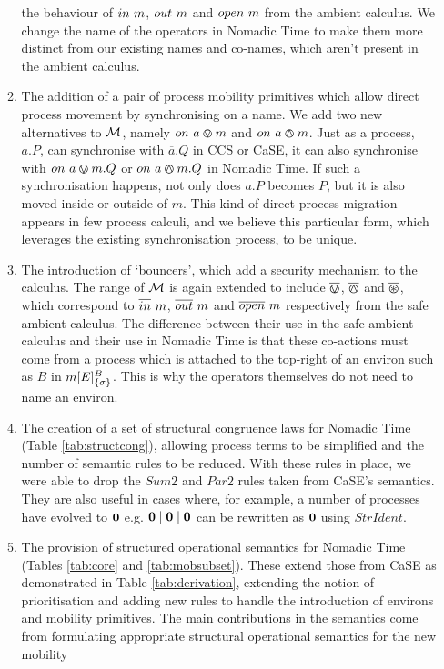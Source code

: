 \begin{enumerate}
\begin{enumerate}[\bfseries {C1.}1]
  the behaviour of $in\ m$, $out\ m$ and $open\ m$ from
  the ambient calculus.  We change the name of the operators in
  Nomadic Time to make them more distinct from our existing names and
  co-names, which aren't present in the ambient calculus.
\item The addition of a pair of process mobility primitives which
  allow direct process movement by synchronising on a name.  We add
  two new alternatives to $\text{$\mathcal{M}$}$, namely $on\ a \varovee m$ and
  $on\ a \varowedge m$.  Just as a process, $a.P$, can synchronise with
  $\overline{a}.Q$ in CCS or CaSE, it can also synchronise with
  $on\ a \varovee m.Q$ or $on\ a \varowedge m.Q$ in Nomadic Time.  If such a
  synchronisation happens, not only does $a.P$ becomes $P$, but it is
  also moved inside or outside of $m$.  This kind of direct process
  migration appears in few process calculi, and we believe this
  particular form, which leverages the existing synchronisation
  process, to be unique.
\item The introduction of `bouncers', which add a security mechanism
  to the calculus.  The range of $\text{$\mathcal{M}$}$ is again extended to include
  $\overline{\varovee}$, $\overline{\varowedge}$ and $\overline{\varoast}$, which correspond to $\overline{in}\ m$,
  $\overline{out}\ m$ and $\overline{open}\ m$ respectively from the safe ambient
  calculus.  The difference between their use in the safe ambient
  calculus and their use in Nomadic Time is that these co-actions must
  come from a process which is attached to the top-right of an environ
  such as $B$ in ${m}[ E ]^{B}_{\{\sigma\}}$.  This is why the operators
  themselves do not need to name an environ.
\item The creation of a set of structural congruence laws for Nomadic
  Time (Table \ref{tab:structcong}), allowing process terms to be
  simplified and the number of semantic rules to be reduced.  With
  these rules in place, we were able to drop the $Sum2$ and $Par2$
  rules taken from CaSE's semantics.  They are also useful in cases
  where, for example, a number of processes have evolved to $\textbf{0}$
  e.g. $\textbf{0} \;|\; \textbf{0} \;|\; \textbf{0}$ can be rewritten as $\textbf{0}$ using
  $StrIdent$.
\item The provision of structured operational semantics for Nomadic
  Time (Tables \ref{tab:core} and \ref{tab:mobsubset}).  These extend
  those from CaSE as demonstrated in Table \ref{tab:derivation},
  extending the notion of prioritisation and adding new rules to
  handle the introduction of environs and mobility primitives.  The
  main contributions in the semantics come from formulating
  appropriate structural operational semantics for the new mobility

\end{enumerate}
\end{enumerate}
